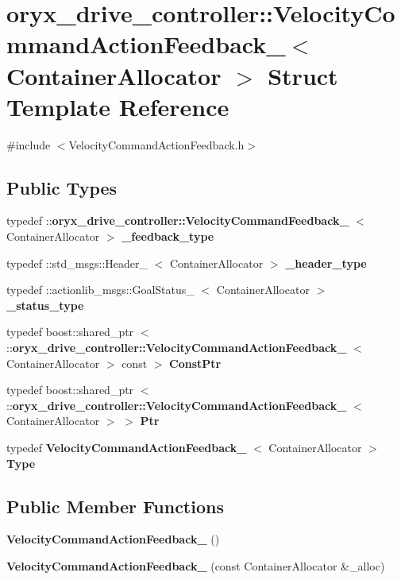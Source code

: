 \section{oryx\-\_\-drive\-\_\-controller\-:\-:\-Velocity\-Command\-Action\-Feedback\-\_\-$<$ \-Container\-Allocator $>$ \-Struct \-Template \-Reference}
\label{structoryx__drive__controller_1_1VelocityCommandActionFeedback__}


{\ttfamily \#include $<$\-Velocity\-Command\-Action\-Feedback.\-h$>$}

\subsection*{\-Public \-Types}
\begin{DoxyCompactItemize}
\item 
typedef \*
\-::{\bf oryx\-\_\-drive\-\_\-controller\-::\-Velocity\-Command\-Feedback\-\_\-}\*
$<$ \-Container\-Allocator $>$ {\bf \-\_\-feedback\-\_\-type}
\item 
typedef \-::std\-\_\-msgs\-::\-Header\-\_\-\*
$<$ \-Container\-Allocator $>$ {\bf \-\_\-header\-\_\-type}
\item 
typedef \*
\-::actionlib\-\_\-msgs\-::\-Goal\-Status\-\_\-\*
$<$ \-Container\-Allocator $>$ {\bf \-\_\-status\-\_\-type}
\item 
typedef boost\-::shared\-\_\-ptr\*
$<$ \-::{\bf oryx\-\_\-drive\-\_\-controller\-::\-Velocity\-Command\-Action\-Feedback\-\_\-}\*
$<$ \-Container\-Allocator $>$ const  $>$ {\bf \-Const\-Ptr}
\item 
typedef boost\-::shared\-\_\-ptr\*
$<$ \-::{\bf oryx\-\_\-drive\-\_\-controller\-::\-Velocity\-Command\-Action\-Feedback\-\_\-}\*
$<$ \-Container\-Allocator $>$ $>$ {\bf \-Ptr}
\item 
typedef \*
{\bf \-Velocity\-Command\-Action\-Feedback\-\_\-}\*
$<$ \-Container\-Allocator $>$ {\bf \-Type}
\end{DoxyCompactItemize}
\subsection*{\-Public \-Member \-Functions}
\begin{DoxyCompactItemize}
\item 
{\bf \-Velocity\-Command\-Action\-Feedback\-\_\-} ()
\item 
{\bf \-Velocity\-Command\-Action\-Feedback\-\_\-} (const \-Container\-Allocator \&\-\_\-alloc)
\end{DoxyCompactItemize}
